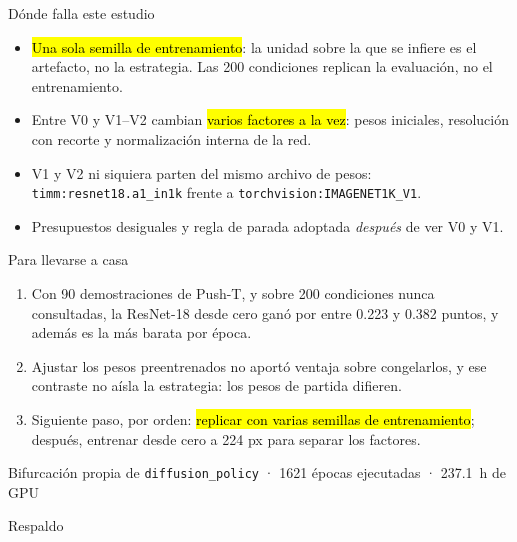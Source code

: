 \documentclass[aspectratio=169,11pt]{beamer}
\begin{document}
\begin{frame}{Dónde falla este estudio}
  \begin{itemize}
    \item \hl{Una sola semilla de entrenamiento}: la unidad sobre la que se infiere es el
          artefacto, no la estrategia. Las \num{200} condiciones replican la evaluación,
          no el entrenamiento.
    \item Entre V0 y V1--V2 cambian \hl{varios factores a la vez}: pesos iniciales,
          resolución con recorte y normalización interna de la red.
    \item V1 y V2 ni siquiera parten del mismo archivo de pesos:
          \texttt{timm:resnet18.a1\_in1k} frente a \texttt{torchvision:IMAGENET1K\_V1}.
    \item Presupuestos desiguales y regla de parada adoptada \emph{después} de ver V0
          y V1.
  \end{itemize}
\end{frame}

\begin{frame}{Para llevarse a casa}
  \begin{enumerate}
    \item Con \num{90} demostraciones de Push-T, y sobre \num{200} condiciones nunca
          consultadas, la ResNet-18 desde cero ganó por entre \num{0.223} y \num{0.382}
          puntos, y además es la más barata por época.
    \item Ajustar los pesos preentrenados no aportó ventaja sobre congelarlos, y ese
          contraste no aísla la estrategia: los pesos de partida difieren.
    \item Siguiente paso, por orden: \hl{replicar con varias semillas de entrenamiento};
          después, entrenar desde cero a \num{224} px para separar los factores.
  \end{enumerate}
  \vfill
  {\color{tsMute}\small Bifurcación propia de \texttt{diffusion\_policy} ·
    \num{1621} épocas ejecutadas · \SI{237.1}{\hour} de GPU}
\end{frame}

\appendix

\begin{frame}[noframenumbering]{Respaldo}
\end{frame}
\end{document}
